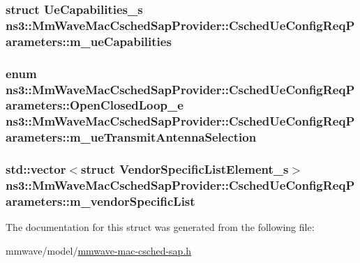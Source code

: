 \subsubsection[{\texorpdfstring{m\+\_\+ue\+Capabilities}{m_ueCapabilities}}]{\setlength{\rightskip}{0pt plus 5cm}struct {\bf Ue\+Capabilities\+\_\+s} ns3\+::\+Mm\+Wave\+Mac\+Csched\+Sap\+Provider\+::\+Csched\+Ue\+Config\+Req\+Parameters\+::m\+\_\+ue\+Capabilities}\hypertarget{structns3_1_1MmWaveMacCschedSapProvider_1_1CschedUeConfigReqParameters_a633078f83d1dd6f823befbe84f1b2281}{}\label{structns3_1_1MmWaveMacCschedSapProvider_1_1CschedUeConfigReqParameters_a633078f83d1dd6f823befbe84f1b2281}
\subsubsection[{\texorpdfstring{m\+\_\+ue\+Transmit\+Antenna\+Selection}{m_ueTransmitAntennaSelection}}]{\setlength{\rightskip}{0pt plus 5cm}enum {\bf ns3\+::\+Mm\+Wave\+Mac\+Csched\+Sap\+Provider\+::\+Csched\+Ue\+Config\+Req\+Parameters\+::\+Open\+Closed\+Loop\+\_\+e}  ns3\+::\+Mm\+Wave\+Mac\+Csched\+Sap\+Provider\+::\+Csched\+Ue\+Config\+Req\+Parameters\+::m\+\_\+ue\+Transmit\+Antenna\+Selection}\hypertarget{structns3_1_1MmWaveMacCschedSapProvider_1_1CschedUeConfigReqParameters_ac629576e51001a37084857d66b186757}{}\label{structns3_1_1MmWaveMacCschedSapProvider_1_1CschedUeConfigReqParameters_ac629576e51001a37084857d66b186757}
\subsubsection[{\texorpdfstring{m\+\_\+vendor\+Specific\+List}{m_vendorSpecificList}}]{\setlength{\rightskip}{0pt plus 5cm}std\+::vector$<$struct {\bf Vendor\+Specific\+List\+Element\+\_\+s}$>$ ns3\+::\+Mm\+Wave\+Mac\+Csched\+Sap\+Provider\+::\+Csched\+Ue\+Config\+Req\+Parameters\+::m\+\_\+vendor\+Specific\+List}\hypertarget{structns3_1_1MmWaveMacCschedSapProvider_1_1CschedUeConfigReqParameters_af06512cd506b24b0c0092ff8cb451820}{}\label{structns3_1_1MmWaveMacCschedSapProvider_1_1CschedUeConfigReqParameters_af06512cd506b24b0c0092ff8cb451820}


The documentation for this struct was generated from the following file\+:\begin{DoxyCompactItemize}
\item 
mmwave/model/\hyperlink{mmwave-mac-csched-sap_8h}{mmwave-\/mac-\/csched-\/sap.\+h}\end{DoxyCompactItemize}
